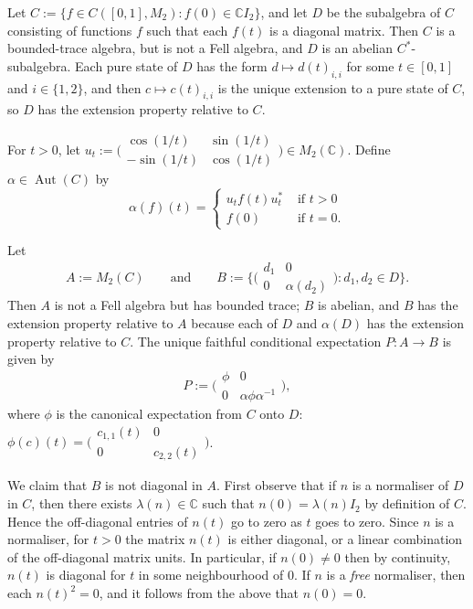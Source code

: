\documentclass[12pt,a4paper]{amsart}
\newcommand{\field}[1]{\mathbb{#1}}
\newcommand{\CC}{\field{C}}
\newcommand{\Aut}{\operatorname{Aut}}
\begin{document}
\begin{example}\label{ex:alex}
Let $C := \{f \in C([0,1],M_2) : f(0) \in \CC I_2\}$, and let
$D$ be the subalgebra of $C$ consisting of functions $f$ such
that each $f(t)$ is a diagonal matrix. Then $C$ is a
bounded-trace algebra, but is not a Fell algebra, and $D$ is an
abelian $C^*$-subalgebra. Each pure state of $D$ has the form
$d \mapsto d(t)_{i,i}$ for some $t \in [0,1]$ and $i \in
\{1,2\}$, and then $c \mapsto c(t)_{i,i}$ is the unique
extension to a pure state of $C$, so $D$ has the extension
property relative to $C$.

For $t > 0$, let $u_t := \big(\begin{smallmatrix} \cos(1/t) &
\sin(1/t) \\ -\sin(1/t) & \cos(1/t)\end{smallmatrix}\big) \in
M_2(\CC)$. Define $\alpha \in \Aut(C)$ by
\[
\alpha(f)(t) =
    \begin{cases}
        u_t f(t) u^*_t &\text{ if $t > 0$} \\
        f(0) &\text{ if $t = 0$.}
    \end{cases}
\]

Let
\[
A := M_2(C)\qquad\text{and}\qquad B :=
    \Big\{\Big(\begin{array}{cc}d_1 & 0 \\ 0 & \alpha(d_2) \end{array}\Big) : d_1, d_2 \in D\Big\}.
\]
Then $A$ is not a Fell algebra but has bounded trace; $B$ is abelian, and $B$ has the
extension property relative to $A$ because each of $D$ and
$\alpha(D)$ has the extension property relative to $C$. The
unique faithful conditional expectation $P : A \to B$ is given
by
\[
P := \Big(\begin{array}{cc} \phi & 0 \\ 0 & \alpha \phi \alpha^{-1} \end{array}\Big),
\]
where $\phi$ is the canonical expectation from $C$ onto $D$:
$\phi(c)(t) = \big(\begin{smallmatrix} c_{1,1}(t) & 0 \\ 0 &
c_{2,2}(t)\end{smallmatrix}\big)$.

We claim that $B$ is not diagonal in $A$. First observe that if
$n$ is a normaliser of $D$ in $C$, then there exists
$\lambda(n) \in \CC$ such that $n(0) = \lambda(n)I_2$ by
definition of $C$. Hence the off-diagonal entries of $n(t)$ go
to zero as $t$ goes to zero. Since $n$ is a normaliser, for $t
> 0$ the matrix $n(t)$ is either diagonal, or a linear combination
of the off-diagonal matrix units. In particular, if $n(0) \not=
0$ then by continuity, $n(t)$ is diagonal for $t$ in some
neighbourhood of $0$. If $n$ is a \emph{free} normaliser, then
each $n(t)^2 = 0$, and it follows from the above that $n(0) =
0$.


\end{example}
\end{document}
